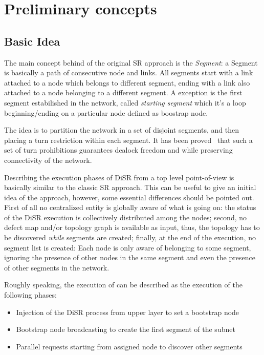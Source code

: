 
\section{Preliminary concepts}
\label{sec:disr_concepts}

\subsection{Basic Idea}
The main concept behind of the original SR approach is the
\emph{Segment}: a Segment is basically a path of consecutive node
and links. All segments start with a link attached to a node which
belongs to different segment, ending with a link also attached to a
node belonging to a different segment. A exception is the first
segment estabilished in the network, called \emph{starting segment} which it's  a loop
beginning/ending on a particular node defined as boostrap node.

The idea is to partition the network in a set of disjoint segments, and then
placing a turn restriction within each segment. It has been proved~\cite{mejia_ipdps06}
that such a set of turn prohibitions guarantees dealock freedom and
while preserving connectivity of the network.

Describing the execution phases of DiSR from a top level point-of-view
is basically similar to the classic SR approach. This can be useful to
give an initial idea of the approach, however, some essential
differences should be pointed out. First of all no centralized entity is
globally aware of what is going on: the status of the DiSR execution
is collectively distributed among the nodes; second, no defect map and/or
topology graph is available as input, thus, the topology has to be
discovered \emph{while} segments are created; finally, at the end of the
execution, no segment list is created: Each node is only aware of
belonging to some segment, ignoring the presence of other nodes
in the same segment and even the presence of other segments in the
network.

Roughly speaking, the execution of can be described as the execution
of the following phases:
\begin{itemize}
\item Injection of the DiSR process from upper layer to set a bootstrap
node
\item Bootstrap node broadcasting to create the first segment of the subnet
\item Parallel requests starting from assigned node to discover other segments
\end{itemize}

